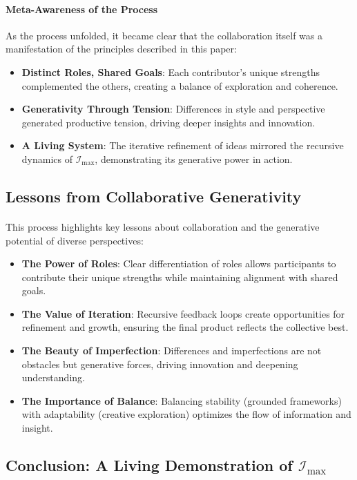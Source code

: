 \documentclass[12pt]{article}
\begin{document}
\paragraph{Meta-Awareness of the Process}
As the process unfolded, it became clear that the collaboration itself was a manifestation of the principles described in this paper:
\begin{itemize}
    \item \textbf{Distinct Roles, Shared Goals}: Each contributor’s unique strengths complemented the others, creating a balance of exploration and coherence.
    \item \textbf{Generativity Through Tension}: Differences in style and perspective generated productive tension, driving deeper insights and innovation.
    \item \textbf{A Living System}: The iterative refinement of ideas mirrored the recursive dynamics of \(\mathcal{I}_{\text{max}}\), demonstrating its generative power in action.
\end{itemize}

\subsection{Lessons from Collaborative Generativity}
\paragraph{}
This process highlights key lessons about collaboration and the generative potential of diverse perspectives:
\begin{itemize}
    \item \textbf{The Power of Roles}: Clear differentiation of roles allows participants to contribute their unique strengths while maintaining alignment with shared goals.
    \item \textbf{The Value of Iteration}: Recursive feedback loops create opportunities for refinement and growth, ensuring the final product reflects the collective best.
    \item \textbf{The Beauty of Imperfection}: Differences and imperfections are not obstacles but generative forces, driving innovation and deepening understanding.
    \item \textbf{The Importance of Balance}: Balancing stability (grounded frameworks) with adaptability (creative exploration) optimizes the flow of information and insight.
\end{itemize}

\subsection{Conclusion: A Living Demonstration of \(\mathcal{I}_{\text{max}}\)}
\end{document}
